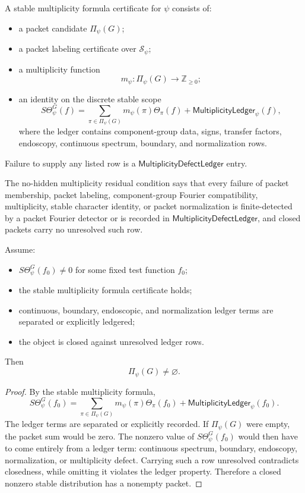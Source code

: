 \begin{definition}
\label{def:unified-reality-stable-multiplicity-formula-cert}
A stable multiplicity formula certificate for $\psi$ consists of:
\begin{itemize}
\item a packet candidate $\Pi_\psi(G)$;
\item a packet labeling certificate over $\mathcal S_\psi$;
\item a multiplicity function
$$
m_\psi:\Pi_\psi(G)\to\mathbb Z_{\ge0};
$$
\item an identity on the discrete stable scope
$$
S\Theta_\psi^G(f)
=
\sum_{\pi\in\Pi_\psi(G)}
m_\psi(\pi)\Theta_\pi(f)
+
\mathsf{MultiplicityLedger}_\psi(f),
$$
where the ledger contains component-group data, signs, transfer factors,
endoscopy, continuous spectrum, boundary, and normalization rows.
\end{itemize}
Failure to supply any listed row is a
$\mathsf{MultiplicityDefectLedger}$ entry.
\end{definition}

\begin{definition}
\label{def:unified-reality-no-hidden-multiplicity-residual}
The no-hidden multiplicity residual condition says that every failure
of packet membership, packet labeling, component-group Fourier
compatibility, multiplicity, stable character identity, or packet
normalization is finite-detected by a packet Fourier detector or is
recorded in $\mathsf{MultiplicityDefectLedger}$, and closed packets
carry no unresolved such row.
\end{definition}

\begin{theorem}
\label{thm:unified-reality-stable-distribution-nonzero-packet-nonempty}
Assume:
\begin{itemize}
\item $S\Theta_\psi^G(f_0)\ne0$ for some fixed test function $f_0$;
\item the stable multiplicity formula certificate holds;
\item continuous, boundary, endoscopic, and normalization ledger terms
are separated or explicitly ledgered;
\item the object is closed against unresolved ledger rows.
\end{itemize}
Then
$$
\Pi_\psi(G)\ne\varnothing.
$$
\end{theorem}
\begin{proof}
By the stable multiplicity formula,
$$
S\Theta_\psi^G(f_0)
=
\sum_{\pi\in\Pi_\psi(G)}
m_\psi(\pi)\Theta_\pi(f_0)
+
\mathsf{MultiplicityLedger}_\psi(f_0).
$$
The ledger terms are separated or explicitly recorded. If
$\Pi_\psi(G)$ were empty, the packet sum would be zero. The nonzero
value of $S\Theta_\psi^G(f_0)$ would then have to come entirely from a
ledger term: continuous spectrum, boundary, endoscopy, normalization, or
multiplicity defect. Carrying such a row unresolved contradicts
closedness, while omitting it violates the ledger property. Therefore a
closed nonzero stable distribution has a nonempty packet.
\end{proof}

